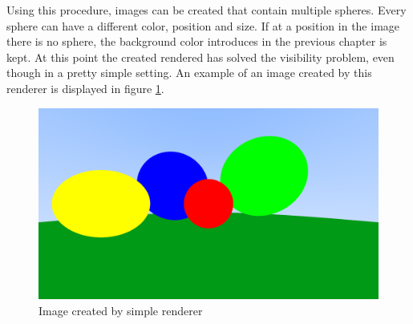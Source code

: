 \documentclass[12pt]{report}
\begin{document}
Using this procedure, images can be created that contain multiple spheres. Every sphere can have a different color, position and size. If at a position in the image there is no sphere, the background color introduces in the previous chapter is kept. At this point the created rendered has solved the visibility problem, even though in a pretty simple setting. An example of an image created by this renderer is displayed in figure \ref{fig:step3}.
\begin{figure}[h!]
\includegraphics[width=\textwidth]{step3}
\centering
\caption{Image created by simple renderer}
\label{fig:step3}
\end{figure}
\end{document}
